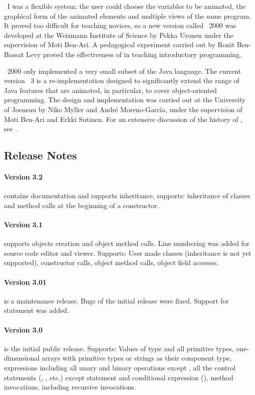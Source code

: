 \jel{}~I was a flexible system: the user could choose the variables to
be animated, the graphical form of the animated elements and multiple
views of the same program. It proved too difficult for teaching novices,
so a new version called \jel{}~2000 was developed at the Weizmann Institute
of Science by Pekka Uronen under the supervision of Moti Ben-Ari.
A pedagogical experiment carried out by Ronit Ben-Bassat Levy proved
the effectiveness of \jel{} in teaching introductory programming.

\jel{}~2000 only implemented a very small subset of the Java language.
The current version \jel{}~3 is a re-implementation designed to
significantly extend the range of Java features that are animated,
in particular, to cover object-oriented programming. The design and
implementation was carried out at the University of Joensuu by
Niko Myller and Andr{\'{e}} Moreno-Garc{\'{\i}}a, under the supervision
of Moti Ben-Ari and Erkki Sutinen. For an extensive discussion of the
history of \jel{}, see \citep{Benari2002a}.

\subsection{Release Notes}
\label{sec:Release_Notes}

\paragraph{Version 3.2} contains documentation and supports inheritance, supports: inheritance of classes and  method calls at the beginning of a constructor.

\paragraph{Version 3.1} supports objects creation and object method calls. Line numbering was added for source code editor and viewer. Supports: User made classes (inheritance is not yet supported), constructor calls, object method calls, object field accesses.

\paragraph{Version 3.01} is a maintenance release. Bugs of the initial
release were fixed. Support for  statement was added.

\paragraph{Version 3.0} is the initial public release. Supports: Values of type  and all primitive types, one-dimensional arrays with primitive types or strings as their
component type, expressions including all unary and binary operations except , all the control statements (, , etc.) except  statement and conditional expression (), method invocations, including recursive invocations.


